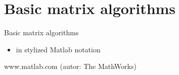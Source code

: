 \section{Basic matrix algorithms}

\begin{frame}{Basic matrix algorithms}


\begin{itemize}
    \item in stylized Matlab notation
\end{itemize}

\begin{flushright}
www.matlab.com (autor: The MathWorks) %
\end{flushright}

\end{frame}

